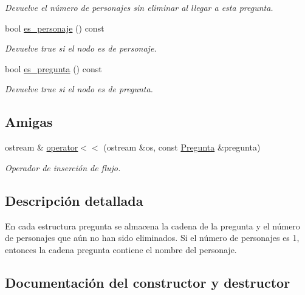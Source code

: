 \begin{DoxyCompactItemize}
\begin{DoxyCompactList}\small\item\em Devuelve el número de personajes sin eliminar al llegar a esta pregunta. \end{DoxyCompactList}\item 
bool \hyperlink{classPregunta_a034eab752003dd0d79d8c7227f79ce15}{es\+\_\+personaje} () const \hypertarget{classPregunta_a034eab752003dd0d79d8c7227f79ce15}{}\label{classPregunta_a034eab752003dd0d79d8c7227f79ce15}

\begin{DoxyCompactList}\small\item\em Devuelve true si el nodo es de personaje. \end{DoxyCompactList}\item 
bool \hyperlink{classPregunta_a6a79daf2b504199417b4ae900caabc96}{es\+\_\+pregunta} () const \hypertarget{classPregunta_a6a79daf2b504199417b4ae900caabc96}{}\label{classPregunta_a6a79daf2b504199417b4ae900caabc96}

\begin{DoxyCompactList}\small\item\em Devuelve true si el nodo es de pregunta. \end{DoxyCompactList}\end{DoxyCompactItemize}
\subsection*{Amigas}
\begin{DoxyCompactItemize}
\item 
ostream \& \hyperlink{classPregunta_a32cc45df44752f792d258d26e3c80b0f}{operator$<$$<$} (ostream \&os, const \hyperlink{classPregunta}{Pregunta} \&pregunta)
\begin{DoxyCompactList}\small\item\em Operador de inserción de flujo. \end{DoxyCompactList}\end{DoxyCompactItemize}


\subsection{Descripción detallada}
En cada estructura pregunta se almacena la cadena de la pregunta y el número de personajes que aún no han sido eliminados. Si el número de personajes es 1, entonces la cadena pregunta contiene el nombre del personaje. 

\subsection{Documentación del constructor y destructor}
